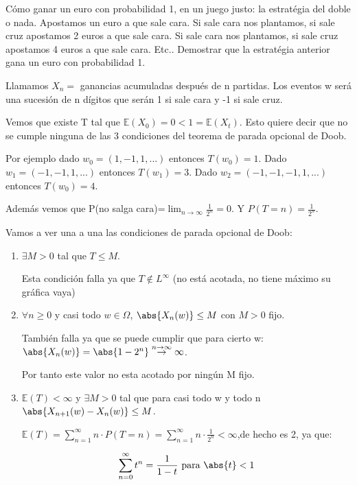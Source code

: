 \begin{problem}[6] C\'omo ganar un euro con probabilidad 1, en un juego justo: la estrat\'egia del doble o nada.
Apostamos un euro a que sale cara. Si sale cara nos plantamos, si sale cruz apostamos
2 euros a que sale cara. Si sale cara nos plantamos, si sale cruz apostamos
4 euros a que sale cara. Etc.. Demostrar que la  estrat\'egia anterior gana un euro
 con probabilidad 1.
\solution

\begin{expla}

\end{expla}
Llamamos $X_n=$ ganancias acumuladas después de n partidas. Los eventos w será una sucesión de n dígitos que serán 1 si sale cara y -1 si sale cruz.

Vemos que existe T tal que $\mathbb{E}(X_0) = 0 < 1 = \mathbb{E}(X_t)$. Esto quiere decir que no se cumple ninguna de las 3 condiciones del teorema de parada opcional de Doob.

Por ejemplo dado $w_0=(1,-1,1,...)$ entonces $T(w_0)=1$. Dado $w_1=(-1,-1,1,...)$ entonces $T(w_1)=3$. Dado $w_2=(-1,-1,-1,1,...)$ entonces $T(w_0)=4$. 

Además vemos que P(no salga cara)=$\lim_{n \rightarrow \infty} \frac{1}{2^n} = 0$. Y $P(T=n)=\frac{1}{2^n}$.

Vamos a ver una a una las condiciones de parada opcional de Doob:
\begin{enumerate}
\item $\exists M >0$ tal que $T \leq M$. 

Esta condición falla ya que $T \notin L^{\infty}$ (no está acotada, no tiene máximo su gráfica vaya)
\item $\forall n \geq 0$ y casi todo $w \in \Omega$, $\abs{X_n(w)} \leq M$ con $M >0$ fijo.

También falla ya que se puede cumplir que para cierto w:$\abs{X_n(w)}=\abs{1-2^n} \stackrel{n \rightarrow \infty}{\rightarrow} \infty$.

Por tanto este valor no esta acotado por ningún M fijo.

\item $\mathbb{E}(T)<\infty$ y $\exists M > 0$ tal que para casi todo w y todo n $\abs{X_{n+1}(w) - X_n(w)} \leq M$.

$\mathbb{E}(T)=\sum_{n=1}^{\infty} n \cdot P(T=n) = \sum_{n=1}^{\infty} n \cdot \frac{1}{2^n} < \infty$,de hecho es 2, ya que:

\[
\sum_{n=0}^{\infty} t^n = \frac{1}{1-t} \text{ para } \abs{t}<1
\]


\end{enumerate}
\end{problem}
